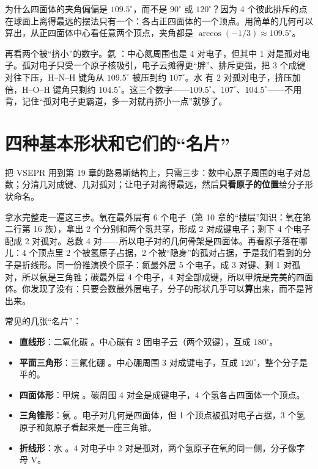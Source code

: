 \begin{qiaoliang}
为什么四面体的夹角偏偏是 $109.5^{\circ}$，而不是 $90^{\circ}$ 或 $120^{\circ}$？因为 4 个彼此排斥的点在球面上离得最远的摆法只有一个：各占正四面体的一个顶点。用简单的几何可以算出，从正四面体中心看任意两个顶点，夹角都是 $\arccos(-1/3) \approx 109.5^{\circ}$。

再看两个被“挤小”的数字。氨 ：中心氮周围也是 4 对电子，但其中 1 对是孤对电子。孤对电子只受一个原子核吸引，电子云摊得更“胖”、排斥更强，把 3 个成键对往下压，H–N–H 键角从 $109.5^{\circ}$ 被压到约 $107^{\circ}$。水  有 2 对孤对电子，挤压加倍，H–O–H 键角只剩约 $104.5^{\circ}$。这三个数字——$109.5^{\circ}$、$107^{\circ}$、$104.5^{\circ}$——不用背，记住“孤对电子更霸道，多一对就再挤小一点”就够了。
\end{qiaoliang}

\section{四种基本形状和它们的“名片”}

把 VSEPR 用到第 19 章的路易斯结构上，只需三步：数中心原子周围的电子对总数；分清几对成键、几对孤对；让电子对离得最远，然后\textbf{只看原子的位置}给分子形状命名。

拿水完整走一遍这三步。氧在最外层有 6 个电子（第 10 章的“楼层”知识：氧在第二行第 16 族），拿出 2 个分别和两个氢共享，形成 2 对成键电子；剩下 4 个电子配成 2 对孤对。总数 4 对——所以电子对的几何骨架是四面体。再看原子落在哪儿：4 个顶点里 2 个被氢原子占据，2 个被“隐身”的孤对占据，于是我们看到的分子是折线形。同一份推演换个原子：氮最外层 5 个电子，成 3 对键、剩 1 对孤对，所以氨是三角锥；碳最外层 4 个电子，4 对全部成键，所以甲烷是完美的四面体。你发现了没有：只要会数最外层电子，分子的形状几乎可以\textbf{算}出来，而不是背出来。

常见的几张“名片”：

\begin{itemize}[itemsep=2pt]
\item \textbf{直线形}：二氧化碳 。中心碳有 2 团电子云（两个双键），互成 $180^{\circ}$。
\item \textbf{平面三角形}：三氟化硼 。中心硼周围 3 对成键电子，互成 $120^{\circ}$，整个分子是平的。
\item \textbf{四面体形}：甲烷 。碳周围 4 对全是成键电子，4 个氢各占四面体一个顶点。
\item \textbf{三角锥形}：氨 。电子对几何是四面体，但 1 个顶点被孤对电子占据，3 个氢原子和氮原子看起来是一座三角锥。
\item \textbf{折线形}：水 。4 对电子中 2 对是孤对，两个氢原子在氧的同一侧，分子像字母 V。
\end{itemize}

